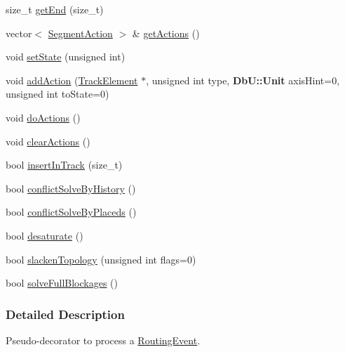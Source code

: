 \begin{DoxyCompactItemize}
\item 
size\+\_\+t \hyperlink{classKite_1_1SegmentFsm_aaf31c0a3018908a2ee26a8ea9e893eb1}{get\+End} (size\+\_\+t)
\item 
vector$<$ \hyperlink{classKite_1_1SegmentAction}{Segment\+Action} $>$ \& \hyperlink{classKite_1_1SegmentFsm_ab3b06bb353ee9333be6b937bffc8fd84}{get\+Actions} ()
\item 
void \hyperlink{classKite_1_1SegmentFsm_adf5147448951f8dc8b4088a1032e97b2}{set\+State} (unsigned int)
\item 
void \hyperlink{classKite_1_1SegmentFsm_ad9384c1cc2a9cd70ab9ff089b56380a0}{add\+Action} (\hyperlink{classKite_1_1TrackElement}{Track\+Element} $\ast$, unsigned int type, \textbf{ Db\+U\+::\+Unit} axis\+Hint=0, unsigned int to\+State=0)
\item 
void \hyperlink{classKite_1_1SegmentFsm_abbcf429498049478d4d8ab94cdb4a022}{do\+Actions} ()
\item 
void \hyperlink{classKite_1_1SegmentFsm_a4cf911f1f4e5ac588d502c9d069a1bde}{clear\+Actions} ()
\item 
bool \hyperlink{classKite_1_1SegmentFsm_a7140b507da2cab137d968a037bed19df}{insert\+In\+Track} (size\+\_\+t)
\item 
bool \hyperlink{classKite_1_1SegmentFsm_a0d9a9926ae67cc7998799347f135e28a}{conflict\+Solve\+By\+History} ()
\item 
bool \hyperlink{classKite_1_1SegmentFsm_a9c0fa6a9067b6e027e24f38330f627dc}{conflict\+Solve\+By\+Placeds} ()
\item 
bool \hyperlink{classKite_1_1SegmentFsm_a0b8e8be9d7c9501be9534d3c2a9dd586}{desaturate} ()
\item 
bool \hyperlink{classKite_1_1SegmentFsm_a623d68f599c0de60cdd36af3f183e6f1}{slacken\+Topology} (unsigned int flags=0)
\item 
bool \hyperlink{classKite_1_1SegmentFsm_ab8ae818baad1d0a274a7e8c308ca3f92}{solve\+Full\+Blockages} ()
\end{DoxyCompactItemize}


\subsubsection{Detailed Description}
Pseudo-\/decorator to process a \hyperlink{classKite_1_1RoutingEvent}{Routing\+Event}. 

